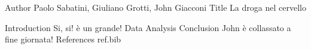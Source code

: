 
Author Paolo Sabatini, Giuliano Grotti, John Giacconi 
Title	La droga nel cervello
	
Introduction	Si, si! è un grande!
Data
Analysis
Conclusion John è collassato a fine giornata!
References ref.bib
